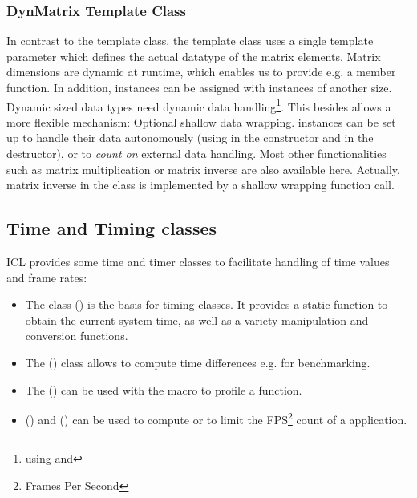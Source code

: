 \subsubsection{DynMatrix Template Class}

In contrast to the  template class, the  template class uses a single template parameter which defines the actual datatype of the matrix elements. Matrix dimensions are dynamic at runtime, which enables us to provide e.g. a  member function. In addition,  instances can be assigned with  instances of another size. Dynamic sized data types need dynamic data handling\footnote{using  and }. This besides allows a more flexible mechanism: Optional shallow data wrapping.  instances can be set up to handle their data autonomously (using  in the constructor and  in the destructor), or to \emph{count on} external data handling. Most other functionalities such as matrix multiplication or matrix inverse are also available here. Actually, matrix inverse in the  class is implemented by a shallow wrapping  function call.



\subsection{Time and Timing classes}
ICL provides some time and timer classes to facilitate handling of time values and frame rates:
\begin{itemize}
\item The  class () is the basis for timing classes. It provides a static function  to obtain the current system time, as well as a variety manipulation and conversion functions.
\item The  () class allows to compute time differences e.g. for benchmarking.
\item The  () can be used with the macro  to profile a function.
\item {} () and  () can be used to compute or to limit the FPS\footnote{Frames Per Second} count of a application.
\end{itemize}

